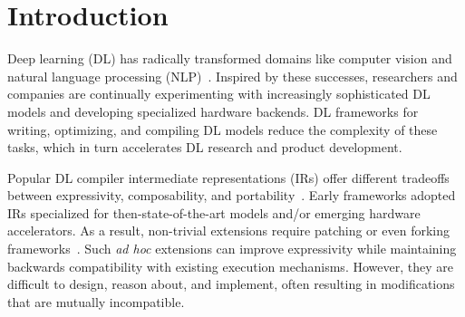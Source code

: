 


  \section{Introduction}
  \label{sec:intro}

  Deep learning (DL) has radically transformed domains like
    computer vision and
    natural language processing (NLP)~\cite{yolo, recent_trends_in_nlp}.
  Inspired by these successes,
    researchers and companies are continually
    experimenting with increasingly sophisticated DL models and
    developing specialized hardware backends.
  DL frameworks for writing, optimizing, and compiling DL models
    reduce the complexity of these tasks,
    which in turn accelerates DL research and product development.

  Popular DL compiler intermediate representations (IRs) offer different tradeoffs
    between expressivity, composability, and portability~\cite{
      tensorflow, pytorch_ad, chainer_learningsys2015, tangent, theano, glow}.
  Early frameworks adopted IRs
    specialized for then-state-of-the-art models and/or
    emerging hardware accelerators.
  As a result, non-trivial extensions require
    patching or even forking frameworks~\cite{
      tf_fold, tf_lite, tangent, tf_eager, xla, glow, torchscript}.
  Such \textit{ad hoc} extensions can improve expressivity
    while maintaining backwards compatibility with existing execution mechanisms.
  However, they are difficult to design, reason about, and implement,
    often resulting in modifications that are mutually incompatible.

